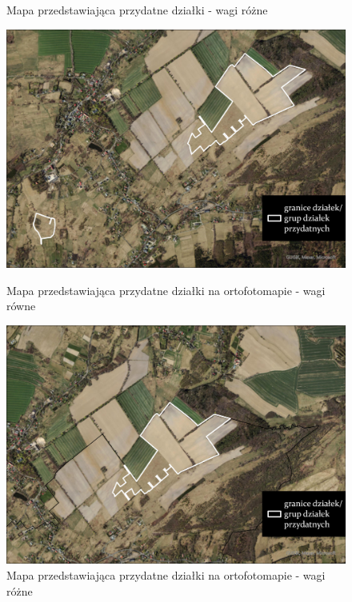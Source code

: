 \documentclass{article}
\begin{document}
\begin{figure}[H]
\begin{minipage}[t]{0.48\textwidth}
        \caption{Mapa przedstawiająca przydatne działki - wagi różne}
        \label{fig:przydatne-dzialki-rozne}
    \end{minipage}
\end{figure}


\begin{figure}[H]
    \begin{minipage}[t]{0.48\textwidth}
        \centering
        \includegraphics[width=\linewidth]{img/dzialki-przydatne-ortofoto.jpg}
        \caption{Mapa przedstawiająca przydatne działki na ortofotomapie - wagi równe}
        \label{fig:dzialki-ortofoto-rowne}
    \end{minipage}
    \hfill
    \begin{minipage}[t]{0.48\textwidth}
        \centering
        \includegraphics[width=\linewidth]{img/roznewagi-dzialki-przydatne-ortofoto.jpg}
        \caption{Mapa przedstawiająca przydatne działki na ortofotomapie - wagi różne}
        \label{fig:dzialki-ortofoto-rozne}
    \end{minipage}
\end{figure}
\end{document}
